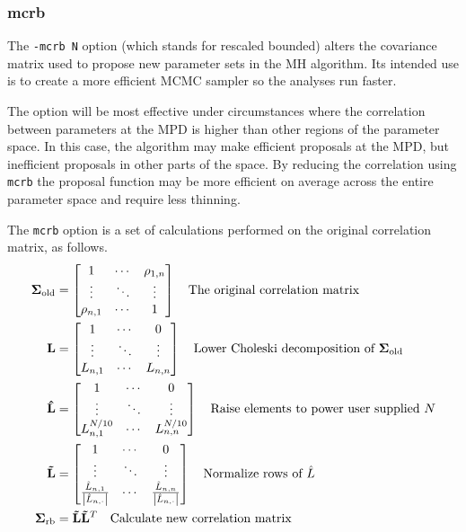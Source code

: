 \documentclass{article}\usepackage[]{graphicx}\usepackage[]{color}
\begin{document}
\subsubsection{mcrb}\label{sec:mcrb}
The \texttt{-mcrb N} option (which stands for rescaled
bounded) alters the covariance matrix used to propose new
parameter sets in the MH algorithm. Its intended use is to
create a more efficient MCMC sampler so the analyses run
faster.

The option will be most effective under circumstances where
the correlation between parameters at the MPD is higher than
other regions of the parameter space. In this case, the
algorithm may make efficient proposals at the MPD, but
inefficient proposals in other parts of the space. By
reducing the correlation using \texttt{mcrb} the proposal
function may be more efficient on average across the entire
parameter space and require less thinning.


The \texttt{mcrb} option is a set of calculations performed
on the original correlation matrix, as follows.
\begin{align*}
  \mathbf{\Sigma_{\text{old}}}&=
  \begin{bmatrix}
    1 & \cdots & \rho_{1,n}\\
    \vdots & \ddots & \vdots\\
    \rho_{n,1} & \cdots & 1
  \end{bmatrix}
  \quad\text{The original correlation matrix}\\
  \mathbf{L}&=\begin{bmatrix}
    1 & \cdots & 0\\
    \vdots & \ddots & \vdots\\
    L_{n,1} & \cdots & L_{n,n}
  \end{bmatrix}
  \quad\text{Lower Choleski decomposition of $ \mathbf{\Sigma_{\text{old}}}$}\\
  \mathbf{\hat{L}}&=\begin{bmatrix}
    1 & \cdots & 0\\
    \vdots & \ddots & \vdots\\
    L_{n,1}^{N/10} & \cdots & L_{n,n}^{N/10}
  \end{bmatrix}
  \quad\text{Raise elements to power user supplied $N$}\\
  \mathbf{\tilde{L}}&=\begin{bmatrix}
    1 & \cdots & 0\\
    \vdots & \ddots & \vdots\\
    \frac{\hat{L}_{n,1}}{\left | \hat{L}_{n,\cdot}\right |} & \cdots &
    \frac{\hat{L}_{n,n}}{\left | \hat{L}_{n,\cdot}\right |}
  \end{bmatrix}
  \quad\text{Normalize rows of $\hat{L}$ }\\
  \mathbf{\Sigma_{\text{rb}}}&=\mathbf{\tilde{L}}\mathbf{\tilde{L}}^T
  \quad\text{Calculate new correlation matrix}
\end{align*}
\end{document}
